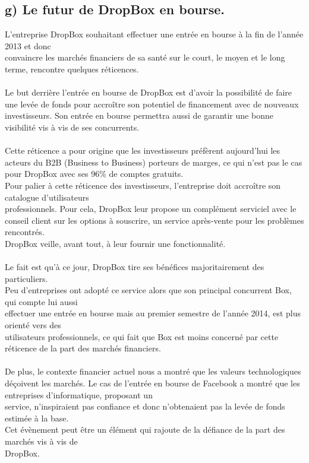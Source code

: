 \documentclass[a4paper, 10pt]{article}
\begin{document}
\subsection*{g) Le futur de DropBox en bourse.}
L'entreprise DropBox souhaitant effectuer une entrée en bourse à la fin de l'année 2013 et
donc\\convaincre les marchés financiers de sa santé sur le court, le moyen et le long terme, rencontre quelques réticences.\\ \\
Le but derrière l'entrée en bourse de DropBox est d'avoir la possibilité de faire une levée de fonds
pour accroître son potentiel de financement avec de nouveaux investisseurs.
Son entrée en bourse permettra aussi de garantir une bonne visibilité vis à vis de ses concurrents.\\ \\
Cette réticence a pour origine que les investisseurs préfèrent aujourd'hui les acteurs du B2B (Business to Business) porteurs de marges,
ce qui n'est pas le cas pour DropBox avec ses 96\% de comptes gratuits.\\
Pour palier à cette réticence des investisseurs, l'entreprise doit accroître son catalogue d'utilisateurs\\professionnels.
Pour cela, DropBox leur propose un complément serviciel avec le conseil client sur les options à souscrire,
un service après-vente pour les problèmes rencontrés.\\
DropBox veille, avant tout, à leur fournir une fonctionnalité.\\ \\
Le fait est qu'à ce jour, DropBox tire ses bénéfices majoritairement des particuliers.\\
Peu d'entreprises ont adopté ce service alors que son principal concurrent Box,
qui compte lui aussi\\effectuer une entrée en bourse mais au premier semestre de l'année 2014,
est plus orienté vers des\\utilisateurs professionnels,
ce qui fait que Box est moins concerné par cette réticence de la part des marchés financiers.\\ \\
De plus, le contexte financier actuel nous a montré que les valeurs technologiques déçoivent les marchés.
Le cas de l'entrée en bourse de Facebook a montré que les entreprises d'informatique, proposant un\\service,
n'inspiraient pas confiance et donc n'obtenaient pas la levée de fonds estimée à la base.\\
Cet évènement peut être un élément qui rajoute de la défiance de la part des marchés vis à vis de\\DropBox.
\end{document}
